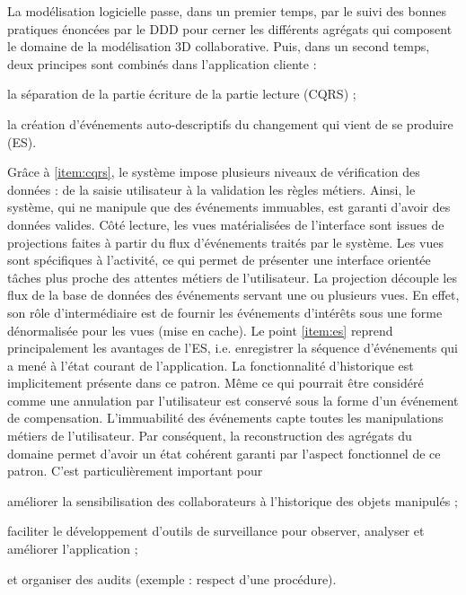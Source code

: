 La modélisation logicielle passe, 
dans un premier temps, par le suivi des bonnes pratiques énoncées par le 
\gls{DDD} pour cerner les différents agrégats qui composent le domaine de la 
modélisation 3D collaborative. 
Puis, dans un second temps, deux principes sont combinés dans l'application 
cliente : 
\begin{enumerate*}[label=(\roman*)]
	\item \label{item:cqrs}la séparation de la partie écriture de la partie lecture 
	(\gls{CQRS}) ;
	\item \label{item:es} la création d'événements auto-descriptifs du changement 
	qui vient de se 
	produire (\gls{ES}).
\end{enumerate*}
Grâce à \ref{item:cqrs}, le système impose plusieurs niveaux de vérification des données : de 
la saisie utilisateur à la validation les règles métiers. Ainsi, le système, qui ne 
manipule que des événements immuables, est garanti d'avoir des données valides.
Côté lecture, les vues matérialisées de l'interface sont issues de projections faites 
à partir du flux d'événements traités par le système. Les vues sont spécifiques à 
l'activité, ce qui permet de présenter une interface orientée tâches plus proche des 
attentes métiers de l'utilisateur. La projection découple les flux de la base 
de données des événements servant une ou plusieurs vues. En effet, son rôle 
d'intermédiaire est de fournir les événements d'intérêts sous une forme 
dénormalisée pour les vues (mise en cache).
Le point \ref{item:es} reprend principalement les avantages de l'\gls{ES}, i.e. 
enregistrer la 
séquence d'événements qui a mené à l'état courant de l'application. La 
fonctionnalité d'historique est implicitement présente dans ce patron. Même ce qui 
pourrait être considéré comme une \og annulation\fg{} par l'utilisateur est conservé 
sous la forme d'un événement de compensation. L'immuabilité des événements 
capte toutes les manipulations métiers de l'utilisateur. Par conséquent, la 
reconstruction des agrégats du domaine permet d'avoir un état cohérent garanti 
par l'aspect fonctionnel de ce patron. C'est particulièrement important pour 
\begin{enumerate*}[label=(\roman*)]
	\item améliorer la sensibilisation des collaborateurs à l'historique des objets 
	manipulés ;
	\item faciliter le développement d'outils de surveillance pour observer, analyser 
	et améliorer l'application ;
	\item et organiser des audits (exemple : respect d'une procédure).
\end{enumerate*}
%

